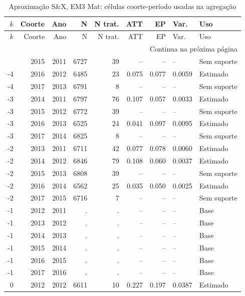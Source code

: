 \begingroup
\tiny
\setlength{\tabcolsep}{2.2pt}
\renewcommand{\arraystretch}{0.82}
\begin{longtable}{rrrrrrrll}
\caption{Aproximação S\&X, EM3 Mat: células coorte-período usadas na agregação}
\label{tab:ap_sx_celulas_em3_mat}\\
\toprule
\(k\) & Coorte & Ano & N & N trat. & ATT & EP & Var. & Uso \\
\midrule
\endfirsthead
\toprule
\(k\) & Coorte & Ano & N & N trat. & ATT & EP & Var. & Uso \\
\midrule
\endhead
\midrule
\multicolumn{9}{r}{Continua na próxima página} \\
\endfoot
\bottomrule
\endlastfoot
-4 & 2015 & 2011 & 6727 & 39 & -- & -- & -- & Sem suporte \\
-4 & 2016 & 2012 & 6485 & 23 & 0.075 & 0.077 & 0.0059 & Estimado \\
-4 & 2017 & 2013 & 6791 & 8 & -- & -- & -- & Sem suporte \\
-3 & 2014 & 2011 & 6797 & 76 & 0.107 & 0.057 & 0.0033 & Estimado \\
-3 & 2015 & 2012 & 6772 & 39 & -- & -- & -- & Sem suporte \\
-3 & 2016 & 2013 & 6525 & 24 & 0.041 & 0.097 & 0.0095 & Estimado \\
-3 & 2017 & 2014 & 6825 & 8 & -- & -- & -- & Sem suporte \\
-2 & 2013 & 2011 & 6711 & 42 & 0.077 & 0.078 & 0.0060 & Estimado \\
-2 & 2014 & 2012 & 6846 & 79 & 0.108 & 0.060 & 0.0037 & Estimado \\
-2 & 2015 & 2013 & 6808 & 39 & -- & -- & -- & Sem suporte \\
-2 & 2016 & 2014 & 6562 & 25 & 0.035 & 0.050 & 0.0025 & Estimado \\
-2 & 2017 & 2015 & 6716 & 7 & -- & -- & -- & Sem suporte \\
-1 & 2012 & 2011 & . & . & -- & -- & -- & Base \\
-1 & 2013 & 2012 & . & . & -- & -- & -- & Base \\
-1 & 2014 & 2013 & . & . & -- & -- & -- & Base \\
-1 & 2015 & 2014 & . & . & -- & -- & -- & Base \\
-1 & 2016 & 2015 & . & . & -- & -- & -- & Base \\
-1 & 2017 & 2016 & . & . & -- & -- & -- & Base \\
0 & 2012 & 2012 & 6611 & 10 & 0.227 & 0.197 & 0.0387 & Estimado \\

\end{longtable}
